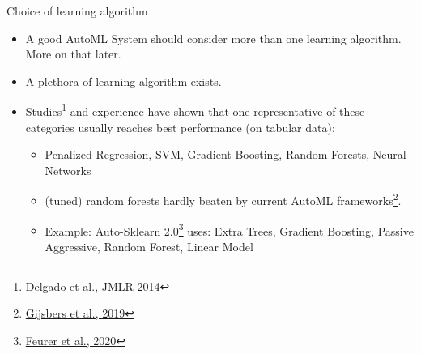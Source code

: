 \begin{frame}{Choice of learning algorithm}
  \begin{itemize}
    \item A good AutoML System should consider more than one learning algorithm. More on that later.
    \item A plethora of learning algorithm exists.
    \item Studies\footnote{\href{https://dl.acm.org/doi/10.5555/2627435.2697065}{Delgado et al., JMLR 2014}} and experience have shown that one representative of these categories usually reaches best performance (on tabular data):
    \begin{itemize}
      \item Penalized Regression, SVM, Gradient Boosting, Random Forests, Neural Networks
      \item (tuned) random forests hardly beaten by current AutoML frameworks\footnote{\href{https://arxiv.org/abs/1907.00909}{Gijsbers et al., 2019}}.
      \item Example: Auto-Sklearn 2.0\footnote{\href{https://arxiv.org/abs/2007.04074}{Feurer et al., 2020}} uses: Extra Trees, Gradient Boosting, Passive Aggressive, Random Forest, Linear Model
    \end{itemize}
  \end{itemize}
\end{frame}

